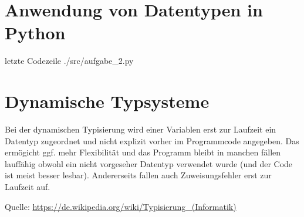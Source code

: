 \section{Anwendung von Datentypen in Python}
 letzte Codezeile
{./src/aufgabe_2.py}

\section{Dynamische Typsysteme}
Bei der dynamischen Typisierung wird einer Variablen erst zur Laufzeit ein Datentyp zugeordnet und nicht explizit vorher im Programmcode angegeben. Das ermögicht ggf. mehr Flexibilität und das Programm bleibt in manchen fällen lauffähig obwohl ein nicht vorgeseher Datentyp verwendet wurde (und der Code ist meist besser lesbar). Andererseits fallen auch Zuweisungsfehler erst zur Laufzeit auf.

Quelle: \url{https://de.wikipedia.org/wiki/Typisierung_(Informatik)}


